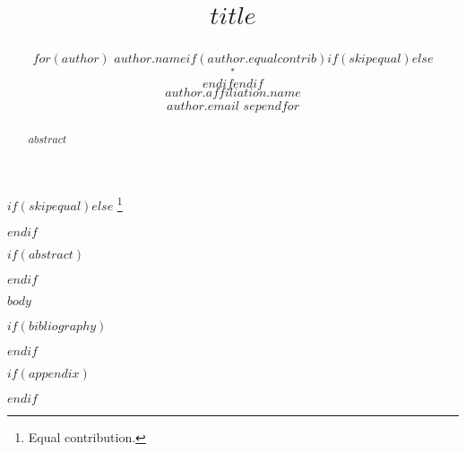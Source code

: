 \documentclass{article}
\title{%
\begin{flushleft}%
$title$%
\end{flushleft}%
}
\author{%
$for(author)$%
\mbox{$author.name$$if(author.equalcontrib)$$if(skipequal)$$else$$$^\ast$$$endif$$endif$}\\
$author.affiliation.name$\\
\mbox{\texttt{$author.email$}}%
$sep$\AND$endfor$%
}
\newcommand\blfootnote[1]{%
  \begingroup
  \renewcommand\thefootnote{}\footnote{\raggedright\hspace{-2em} #1}%
  \addtocounter{footnote}{-1}%
  \endgroup
}
\begin{document}
\frenchspacing

\maketitle

\setnowidow[2]

$if(skipequal)$$else$\blfootnote{\textsuperscript{\ast}Equal contribution.}$endif$

$if(abstract)$
\begin{abstract}
$abstract$
\end{abstract}
$endif$

$body$

$if(bibliography)$
\small


\normalsize
$endif$

$if(appendix)$
\renewcommand\thefigure{S\arabic{figure}}
\renewcommand\thetable{S\arabic{table}}
\setcounter{figure}{0}
\setcounter{table}{0}
\clearpage
\appendix

$endif$
\end{document}
